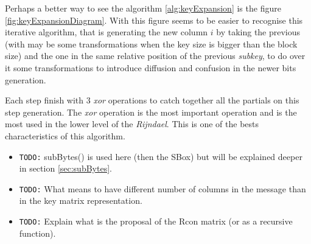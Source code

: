 \documentclass[10pt,a4paper,twoside]{llncs}
\begin{document}
% 

Perhaps a better way to see the algorithm \ref{alg:keyExpansion} is the figure \ref{fig:keyExpansionDiagram}. With this figure seems to be easier to recognise this iterative algorithm, that is generating the new column $i$ by taking the previous (with may be some transformations when the key size is bigger than the block size) and the one in the same relative position of the previous \emph{subkey}, to do over it some transformations to introduce diffusion and confusion in the newer bits generation.

Each step finish with 3 \emph{xor} operations to catch together all the partials on this step generation. The \emph{xor} operation is the most important operation and is the most used in the lower level of the \emph{Rijndael}. This is one of the bests characteristics of this algorithm.

\begin{itemize}
 \item \texttt{TODO:} subBytes() is used here (then the SBox) but will be explained deeper in section \ref{sec:subBytes}.
 \item \texttt{TODO:} What means to have different number of columns in the message than in the key matrix representation.
 \item \texttt{TODO:} Explain what is the proposal of the Rcon matrix (or as a recursive function).
\end{itemize}
\end{document}
